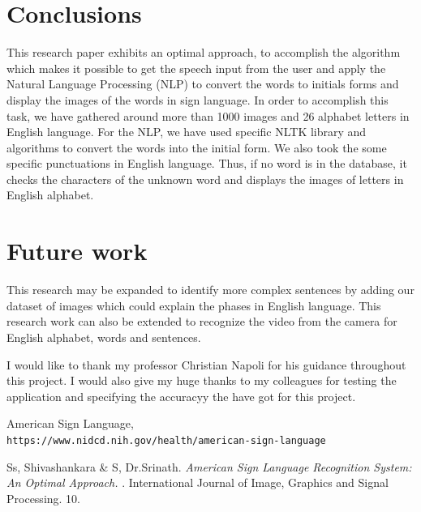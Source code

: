 \documentclass[twocolumn,10pt]{asme2ej}
\begin{document}
\section{Conclusions}
This research paper exhibits an optimal approach, to accomplish the algorithm which makes it possible to get the speech input from the user and apply the Natural Language Processing (NLP) to convert the words to initials forms and display the images of the words in sign language. In order to accomplish this task, we have gathered around more than 1000 images and 26 alphabet letters in English language. For the NLP, we have used specific NLTK library and algorithms to convert the words into the initial form. We also took the some specific punctuations in English language. Thus, if no word is in the database, it checks the characters of the unknown word and displays the images of letters in English alphabet.  

\section{Future work}
This research may be expanded to identify more complex sentences by adding our dataset of images which could explain the phases in English language. This research work can also be extended to recognize the video from the camera for English alphabet, words and sentences. 

\begin{acknowledgment}
I would like to thank my professor Christian Napoli for his guidance throughout this project. I would also give my huge thanks to my colleagues for testing the application and specifying the accuracyy the have got for this project. 
\end{acknowledgment}

\begin{thebibliography}{9}
American Sign Language,
\\\texttt{https://www.nidcd.nih.gov/health/american-sign-language}

Ss, Shivashankara \& S, Dr.Srinath. 
\textit{American Sign Language Recognition System: An Optimal Approach. }. 
International Journal of Image, Graphics and Signal Processing. 10.
\end{thebibliography}
\end{document}
